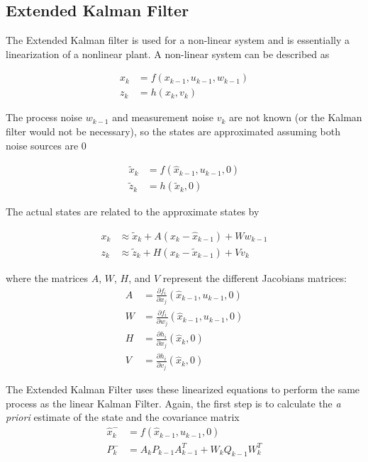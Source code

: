 \subsection{Extended Kalman Filter}
\label{EKFTheory}
The Extended Kalman filter is used for a non-linear system and is essentially a linearization of a nonlinear plant. A non-linear system can be described as \cite{welch1995introduction}

\begin{align}
x_k &= f(x_{k-1},u_{k-1},w_{k-1})\\
z_k &= h(x_k,v_k)
\end{align}

The process noise $w_{k-1}$ and measurement noise $v_k$ are not known (or the Kalman filter would not be necessary), so the states are approximated assuming both noise sources are 0

\begin{align}
\tilde{x}_k &= f(\hat{x}_{k-1},u_{k-1},0)\\
\tilde{z}_k &= h(\tilde{x}_k,0)
\end{align}

The actual states are related to the approximate states by

\begin{align}
x_k &\approx\tilde{x}_k+A(x_k-\hat{x}_{k-1})+Ww_{k-1}\\
z_k &\approx\tilde{z}_k+H(x_k-\tilde{x}_{k-1})+Vv_k
\end{align}

where  the matrices $A$, $W$, $H$, and $V$ represent the different Jacobians matrices:
\begin{align}
A &= \frac{\partial f_i}{\partial x_j}(\hat{x}_{k-1},u_{k-1},0)\\
W &= \frac{\partial f_i}{\partial w_j}(\hat{x}_{k-1},u_{k-1},0)\\
H &= \frac{\partial h_i}{\partial x_j}(\hat{x}_{k},0)\\
V &= \frac{\partial h_i}{\partial v_j}(\hat{x}_{k},0)
\end{align}

The Extended Kalman Filter uses these linearized equations to perform the same process as the linear Kalman Filter. Again, the first step is to calculate the \textit{a priori} estimate of the state and the covariance matrix
\begin{align}
\hat{x}^-_k &=f(\hat{x}_{k-1},u_{k-1},0)\\
P^-_k  &= A_kP_{k-1}A^T_{k-1}+W_kQ_{k-1}W^T_k
\end{align}


